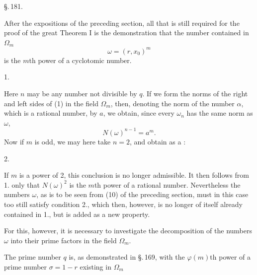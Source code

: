 
\begin{center}
\S.\,181.\\
\end{center}

After the expositions of the preceding section, all that is still required for the proof of the great Theorem I is the demonstration that the number contained in $\Omega_m$
\[
\omega = (r, x_0)^m
\]
is the $m$th power of a cyclotomic number.

1. 

Here $n$ may be any number not divisible by $q$. If we form the norms of the right and left sides of (1) in the field $\Omega_m$, then, denoting the norm of the number $\alpha$, which is a rational number, by $a$, we obtain, since every $\omega_n$ has the same norm as $\omega$,
\[
N(\omega)^{n-1} = a^m.
\]
Now if $m$ is odd, we may here take $n = 2$, and obtain as a :

2. 

If $m$ is a power of 2, this conclusion is no longer admissible. It then follows from 1. only that $N(\omega)^2$ is the $m$th power of a rational number. Nevertheless the numbers $\omega$, as is to be seen from (10) of the preceding section, must in this case too still satisfy condition 2., which then, however, is no longer of itself already contained in 1., but is added as a new property.


For this, however, it is necessary to investigate the decomposition of the numbers $\omega$ into their prime factors in the field $\Omega_m$.

The prime number $q$ is, as demonstrated in \S.\,169, with the $\varphi(m)$th power of a prime number $\sigma = 1 - r$ existing in $\Omega_m$
